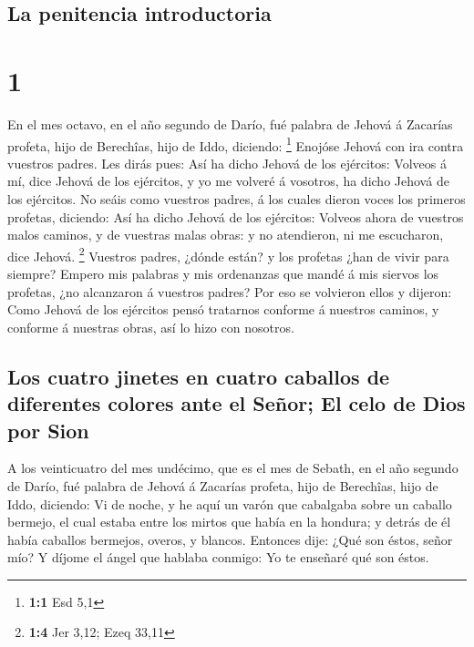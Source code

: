 \hypertarget{la-penitencia-introductoria}{%
\subsection{La penitencia
introductoria}\label{la-penitencia-introductoria}}

\hypertarget{section}{%
\section{1}\label{section}}

 En el mes octavo, en el año segundo de Darío, fué palabra
de Jehová á Zacarías profeta, hijo de Berechîas, hijo de Iddo, diciendo:
\footnote{\textbf{1:1} Esd 5,1}  Enojóse Jehová con ira
contra vuestros padres.  Les dirás pues: Así ha dicho Jehová
de los ejércitos: Volveos á mí, dice Jehová de los ejércitos, y yo me
volveré á vosotros, ha dicho Jehová de los ejércitos.  No
seáis como vuestros padres, á los cuales dieron voces los primeros
profetas, diciendo: Así ha dicho Jehová de los ejércitos: Volveos ahora
de vuestros malos caminos, y de vuestras malas obras: y no atendieron,
ni me escucharon, dice Jehová. \footnote{\textbf{1:4} Jer 3,12; Ezeq
  33,11}  Vuestros padres, ¿dónde están? y los profetas ¿han
de vivir para siempre?  Empero mis palabras y mis ordenanzas
que mandé á mis siervos los profetas, ¿no alcanzaron á vuestros padres?
Por eso se volvieron ellos y dijeron: Como Jehová de los ejércitos pensó
tratarnos conforme á nuestros caminos, y conforme á nuestras obras, así
lo hizo con nosotros.

\hypertarget{los-cuatro-jinetes-en-cuatro-caballos-de-diferentes-colores-ante-el-seuxf1or-el-celo-de-dios-por-sion}{%
\subsection{Los cuatro jinetes en cuatro caballos de diferentes colores
ante el Señor; El celo de Dios por
Sion}\label{los-cuatro-jinetes-en-cuatro-caballos-de-diferentes-colores-ante-el-seuxf1or-el-celo-de-dios-por-sion}}

 A los veinticuatro del mes undécimo, que es el mes de
Sebath, en el año segundo de Darío, fué palabra de Jehová á Zacarías
profeta, hijo de Berechîas, hijo de Iddo, diciendo:  Vi de
noche, y he aquí un varón que cabalgaba sobre un caballo bermejo, el
cual estaba entre los mirtos que había en la hondura; y detrás de él
había caballos bermejos, overos, y blancos.  Entonces dije:
¿Qué son éstos, señor mío? Y díjome el ángel que hablaba conmigo: Yo te
enseñaré qué son éstos.

